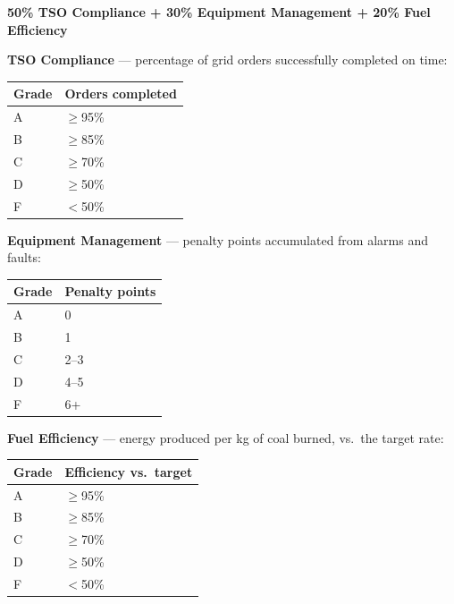 \documentclass[10pt,a5paper]{article}
\begin{document}
\begin{center}
\textbf{50\% TSO Compliance + 30\% Equipment Management + 20\% Fuel Efficiency }
\end{center}

\textbf{TSO Compliance} --- percentage of grid orders successfully completed on time:

\begin{center}
\begin{tabular}{ll}
\toprule
\textbf{Grade} & \textbf{Orders completed} \\
\midrule
A & $\geq$95\% \\
B & $\geq$85\% \\
C & $\geq$70\% \\
D & $\geq$50\% \\
F & $<$50\%   \\
\bottomrule
\end{tabular}
\end{center}

\textbf{Equipment Management} --- penalty points accumulated from alarms and faults:

\begin{center}
\begin{tabular}{ll}
\toprule
\textbf{Grade} & \textbf{Penalty points} \\
\midrule
A & 0       \\
B & 1       \\
C & 2--3    \\
D & 4--5    \\
F & 6+      \\
\bottomrule
\end{tabular}
\end{center}

\textbf{Fuel Efficiency} --- energy produced per kg of coal burned, vs.\ the target rate:

\begin{center}
\begin{tabular}{ll}
\toprule
\textbf{Grade} & \textbf{Efficiency vs.\ target} \\
\midrule
A & $\geq$95\% \\
B & $\geq$85\% \\
C & $\geq$70\% \\
D & $\geq$50\% \\
F & $<$50\%   \\
\bottomrule
\end{tabular}
\end{center}
\end{document}

